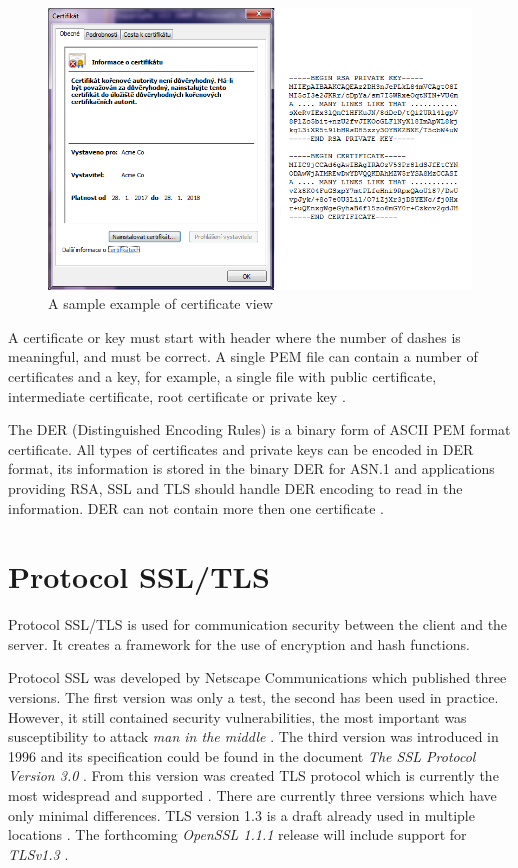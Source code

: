 \documentclass[
  digital, %
  notable,   %
  lof,     %
  lot,     %
]{fithesis3}
\begin{document}
\begin{figure}[th]
	\centering
	\includegraphics[width=1\textwidth]{pem-der}
	\caption{A sample example of certificate view}
	\label{fig:vzorPEM-DER}
\end{figure}

A certificate or key must start with header where the number of dashes is meaningful, and must 
be correct. A single PEM file can contain a number of certificates and a key, for example, a 
single file with public certificate, intermediate certificate, root certificate or private key 
\cite{howToSsl}.

The DER (Distinguished Encoding Rules) is a binary form of ASCII PEM format 
certificate. All types of certificates and private keys can be encoded in DER format, its 
information is stored in the binary DER for ASN.1 and applications providing RSA, SSL and TLS 
should handle DER encoding to read in the information. DER can not contain more then one certificate \cite{bakker_2014}.

\section{Protocol SSL/TLS}
Protocol SSL/TLS is used for communication security between the client and the server. It 
creates a framework for the use of encryption and hash functions.

Protocol SSL was developed by Netscape Communications which published three versions. The first 
version was only a test, the second has been used in practice. However, it still contained 
security vulnerabilities, the most important was susceptibility to attack \textit{man in the 
middle} \cite{oppliger2003security}. %
The third version was introduced in 1996 and its specification could be found in the document 
\textit{The SSL Protocol Version 3.0} \cite{freier2011secure}. From this version was created TLS 
protocol which is currently the most widespread and supported \cite{oppliger2003security}. 
There are currently three versions which have only minimal differences. TLS version 1.3 is a draft 
already used in multiple locations \cite{draft-tls}. The forthcoming \textit{OpenSSL 1.1.1} release 
will include support for \textit{TLSv1.3} \cite{foundation2}.
\end{document}
